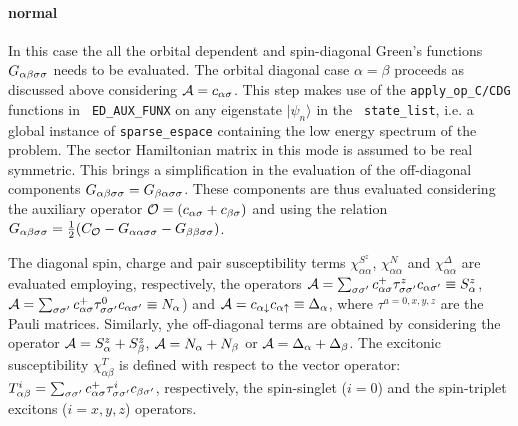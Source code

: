 \documentclass[preprint,3p,10pt]{elsarticle}
\newcommand{\ket}[1]
{|#1\rangle}
\def\a{\alpha}       \def\b{\beta}   \def\g{\gamma}   \def\d{\delta}
\def\AA{{\cal A}}
\def\up{\uparrow} \def\down{\downarrow} \def\dw{\downarrow}
\begin{document}
\paragraph{{\bf normal}}
In this case the all the orbital dependent and spin-diagonal Green's
functions $G_{\a\b\s\s}$ needs to be evaluated. The orbital diagonal case
$\a=\b$ proceeds as discussed above considering $\AA=c_{\a\s}$. This
step makes use of the {\tt apply\_op\_C/CDG} functions in {\tt
  ED\_AUX\_FUNX} on any eigenstate $\ket{\psi_n}$ in the {\tt
  state\_list}, i.e. a global instance of {\tt sparse\_espace}
containing the low energy spectrum of the problem.
The sector Hamiltonian matrix in this mode is assumed to be real
symmetric. This brings a simplification in the evaluation of the
off-diagonal components $G_{\a\b\s\s}=G_{\b\a\s\s}$.
These components are thus evaluated considering the auxiliary operator
$\OO=(c_{\a\s} + c_{\b\s})$ and using the relation
$G_{\a\b\s\s}=\tfrac{1}{2}(C_\OO - G_{\a\a\s\s} - G_{\b\b\s\s})$.

The diagonal spin, charge and pair susceptibility terms
$\chi^{S^z}_{\a\a}$, $\chi^N_{\a\a}$ and $\chi^\Delta_{\a\a}$ are
evaluated employing, respectively, the operators $\AA=\sum_{\s\s'}c^+_{\a\s}\tau^z_{\s\s'}c_{\a\s'}\equiv
S^z_\a$, $\AA=\sum_{\s\s'}c^+_{\a\s}\tau^0_{\s\s'}c_{\a\s'}\equiv
N_\a$) and $\AA=c_{\a\dw}c_{\a\up}\equiv
\Delta_\a$, where
$\tau^{a=0,x,y,z}$ are the Pauli matrices.
Similarly, yhe off-diagonal terms are obtained by considering the operator $\AA=S^z_\a
+ S^z_\b$, $\AA=N_\a + N_\b$ or $\AA=\Delta_\a + \Delta_\b$. 
The excitonic susceptibility $\chi^T_{\a\b}$ is defined with respect
to the vector operator: $T^i_{\a\b} = \sum_{\s\s'}
c^+_{\a\s}\tau^i_{\s\s'}c_{\b\s'}$, respectively, the spin-singlet
($i=0$) and the spin-triplet excitons ($i=x,y,z$) operators.
\end{document}

